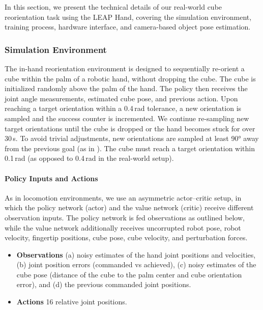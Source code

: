 In this section, we present the technical details of our real-world cube reorientation task using the LEAP Hand, covering the simulation environment, training process, hardware interface, and camera-based object pose estimation.

\subsubsection{Simulation Environment}

The in-hand reorientation environment is designed to sequentially re-orient a cube within the palm of a robotic hand, without dropping the cube. The cube is initialized randomly above the palm of the hand. The policy then receives the joint angle measurements, estimated cube pose, and previous action. Upon reaching a target orientation within a 0.4\,rad tolerance, a new orientation is sampled and the success counter is incremented. We continue re-sampling new target orientations until the cube is dropped or the hand becomes stuck for over 30\,s. To avoid trivial adjustments, new orientations are sampled at least 90° away from the previous goal (as in \cite{handa2023dextreme, li2024_drop}). The cube must reach a target orientation within 0.1\,rad (as opposed to 0.4\,rad in the real-world setup).

\paragraph{Policy Inputs and Actions}
As in locomotion environments, we use an asymmetric actor--critic setup, in which the policy network (actor) and the value network (critic) receive different observation inputs. The policy network is fed observations as outlined below, while the value network additionally receives uncorrupted robot pose, robot velocity, fingertip positions, cube pose, cube velocity, and perturbation forces.
\begin{itemize}[leftmargin=1em]
    \item \textbf{Observations} (a) noisy estimates of the hand joint positions and velocities, (b) joint position errors (commanded vs achieved), (c) noisy estimates of the cube pose (distance of the cube to the palm center and cube orientation error), and (d) the previous commanded joint positions.  
    \item \textbf{Actions} 16 relative joint positions.
\end{itemize}

